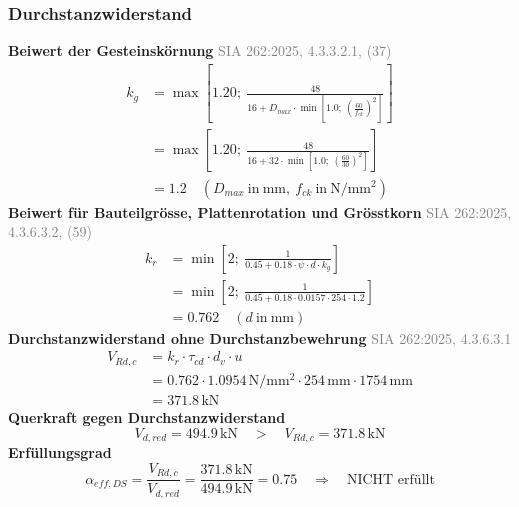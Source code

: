 \documentclass[11pt,a4paper]{article}
\newcommand{\normref}[1]{{\small\textcolor{gray}{#1}}}
\begin{document}
\subsubsection{Durchstanzwiderstand}
\noindent\textbf{Beiwert der Gesteinskörnung} \hfill \normref{SIA 262:2025, 4.3.3.2.1, (37)}
\begin{equation*}
\begin{aligned}
  k_g &= \max\left[1.20;\ \frac{48}{16 + D_{max} \cdot \min\left[1.0;\ \left(\frac{60}{f_{ck}}\right)^{2}\right]}\right] \\
  &= \max\left[1.20;\ \frac{48}{16 + 32 \cdot \min\left[1.0;\ \left(\frac{60}{30}\right)^{2}\right]}\right] \\
  &= 1.2 \quad \left(D_{max}\ \text{in}\ \mathrm{mm},\ f_{ck}\ \text{in}\ \mathrm{N}/\mathrm{mm}^{2}\right)
\end{aligned}
\end{equation*}
\noindent\textbf{Beiwert für Bauteilgrösse, Plattenrotation und Grösstkorn} \hfill \normref{SIA 262:2025, 4.3.6.3.2, (59)}
\begin{equation*}
\begin{aligned}
  k_r &= \min\left[2;\ \frac{1}{0.45 + 0.18 \cdot \psi \cdot d \cdot k_g}\right] \\
  &= \min\left[2;\ \frac{1}{0.45 + 0.18 \cdot 0.0157 \cdot 254 \cdot 1.2}\right] \\
  &= 0.762 \quad \left(d\ \text{in}\ \mathrm{mm}\right)
\end{aligned}
\end{equation*}
\noindent\textbf{Durchstanzwiderstand ohne Durchstanzbewehrung} \hfill \normref{SIA 262:2025, 4.3.6.3.1}
\begin{equation*}
\begin{aligned}
  V_{Rd,c} &= k_r \cdot \tau_{cd} \cdot d_v \cdot u \\
  &= 0.762 \cdot 1.0954\,\mathrm{N}/\mathrm{mm}^{2} \cdot 254\,\mathrm{mm} \cdot 1754\,\mathrm{mm} \\
  &= 371.8\,\mathrm{kN}
\end{aligned}
\end{equation*}
\noindent\textbf{Querkraft gegen Durchstanzwiderstand}
\begin{equation*}
V_{d,red} = 494.9\,\mathrm{kN} \quad > \quad V_{Rd,c} = 371.8\,\mathrm{kN}
\end{equation*}
\noindent\textbf{Erfüllungsgrad}
\begin{equation*}
\alpha_{eff,DS} = \frac{V_{Rd,c}}{V_{d,red}} = \frac{371.8\,\mathrm{kN}}{494.9\,\mathrm{kN}} = 0.75 \quad \Rightarrow \quad \text{NICHT erfüllt}
\end{equation*}
\end{document}
